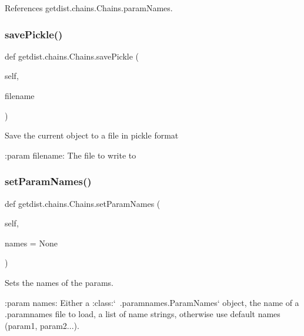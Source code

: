 References getdist.\+chains.\+Chains.\+param\+Names.

\mbox{\label{classgetdist_1_1chains_1_1Chains_abf1564054c1d6e4816d4a4169eaa7d3f}} 
\subsubsection{\texorpdfstring{save\+Pickle()}{savePickle()}}
{\footnotesize\ttfamily def getdist.\+chains.\+Chains.\+save\+Pickle (\begin{DoxyParamCaption}\item[{}]{self,  }\item[{}]{filename }\end{DoxyParamCaption})}

\begin{DoxyVerb}Save the current object to a file in pickle format

:param filename: The file to write to
\end{DoxyVerb}
 \mbox{\label{classgetdist_1_1chains_1_1Chains_a7d33c93e1eb74d6d15ae1849af5d2f8b}} 
\subsubsection{\texorpdfstring{set\+Param\+Names()}{setParamNames()}}
{\footnotesize\ttfamily def getdist.\+chains.\+Chains.\+set\+Param\+Names (\begin{DoxyParamCaption}\item[{}]{self,  }\item[{}]{names = {\ttfamily None} }\end{DoxyParamCaption})}

\begin{DoxyVerb}Sets the names of the params.

:param names: Either a :class:`~.paramnames.ParamNames` object, the name of a .paramnames file to load, a list of name strings,
      otherwise use default names (param1, param2...).
\end{DoxyVerb}
 \mbox{\label{classgetdist_1_1chains_1_1Chains_aa2e6d26b972941cdab11c8d7088fa466}} 
